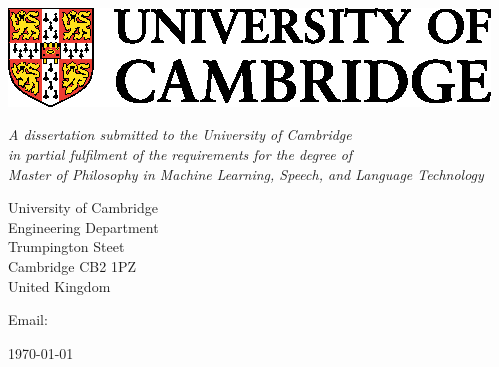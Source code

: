 \documentclass[dissertation.tex]{subfiles}
\begin{document}
\begin{titlepage}

  \begin{center}
    \noindent
    \huge
    \dissertationtitle \\
  \end{center}

  \begin{center}
    \noindent
    \huge
    \authorname \\
    \Large
    \authorcollege      \\[24pt]
    \includegraphics{CUni3.eps}
  \end{center}

  \vspace{24pt}

  \begin{center}
    \noindent
    \large
    {\it A dissertation submitted to the University of Cambridge \\
      in partial fulfilment of the requirements for the degree of \\
    Master of Philosophy in Machine Learning, Speech, and Language Technology}
  \end{center}

  \begin{center}
    \noindent
    University of Cambridge \\
    Engineering Department \\
    Trumpington Steet \\
    Cambridge CB2 1PZ       \\
    {\sc United Kingdom}    \\
  \end{center}

  \begin{center}
    \noindent
    Email: \authoremail \\
  \end{center}

  \begin{center}
    \noindent
    \today
  \end{center}

\end{titlepage}

\newpage
\vspace*{\fill}
\end{document}
